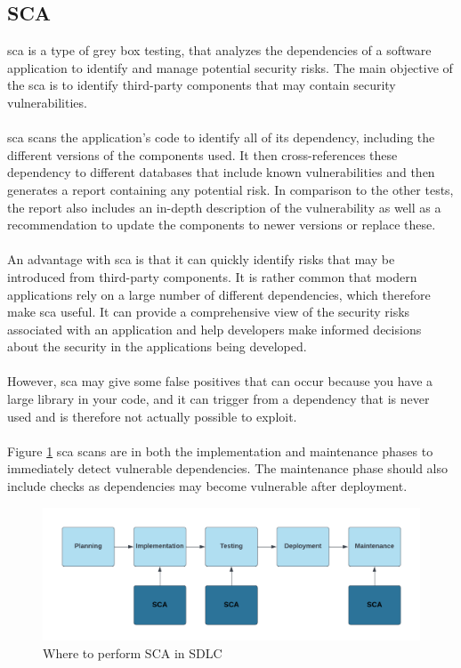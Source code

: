 \subsection{SCA}
\acrlong{sca} is a type of grey box testing, that analyzes the dependencies of a software application to identify and manage potential security risks. The main objective of the \acrshort{sca} is to identify third-party components that may contain security vulnerabilities. \cite{sca}
\\~\\
\acrshort{sca} scans the application's code to identify all of its \gls{dependency}, including the different versions of the components used. It then cross-references these \gls{dependency} to different databases that include known vulnerabilities and then generates a report containing any potential risk. In comparison to the other tests, the report also includes an in-depth description of the vulnerability as well as a recommendation to update the components to newer versions or replace these. 
\\~\\
An advantage with \acrshort{sca} is that it can quickly identify risks that may be introduced from third-party components. It is rather common that modern applications rely on a large number of different dependencies, which therefore make \acrshort{sca} useful. It can provide a comprehensive view of the security risks associated with an application and help developers make informed decisions about the security in the applications being developed. 
\\~\\
However, \acrshort{sca} may give some false positives that can occur because you have a large library in your code, and it can trigger from a dependency that is never used and is therefore not actually possible to exploit.
\\~\\
Figure \ref{fig: Where to perform SCA in SDLC} \acrshort{sca} scans are in both the implementation and maintenance phases to immediately detect vulnerable dependencies. The maintenance phase should also include checks as dependencies may become vulnerable after deployment.
\vspace{2mm}
\begin{figure}[H]
    \centering
    \includegraphics[width=0.8\columnwidth]{Images/sca.png}
    \caption{Where to perform SCA in SDLC} 
    \label{fig: Where to perform SCA in SDLC}
\end{figure}


